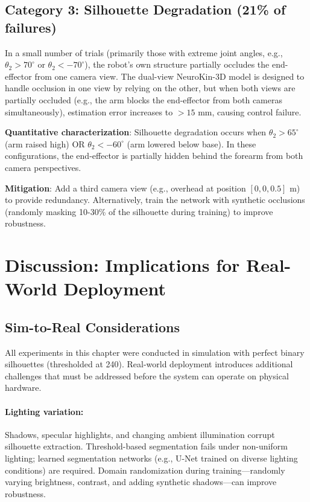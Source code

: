 ﻿\documentclass[12pt,a4paper,oneside]{report}
\begin{document}
\subsection{Category 3: Silhouette Degradation (21\% of failures)}

In a small number of trials (primarily those with extreme joint angles, e.g., $\theta_2 > 70^\circ$ or $\theta_2 < -70^\circ$), the robot's own structure partially occludes the end-effector from one camera view. The dual-view NeuroKin-3D model is designed to handle occlusion in one view by relying on the other, but when both views are partially occluded (e.g., the arm blocks the end-effector from both cameras simultaneously), estimation error increases to $>15$ mm, causing control failure.

\textbf{Quantitative characterization}: Silhouette degradation occurs when $\theta_2 > 65^\circ$ (arm raised high) OR $\theta_2 < -60^\circ$ (arm lowered below base). In these configurations, the end-effector is partially hidden behind the forearm from both camera perspectives.

\textbf{Mitigation}: Add a third camera view (e.g., overhead at position $[0, 0, 0.5]$ m) to provide redundancy. Alternatively, train the network with synthetic occlusions (randomly masking 10-30\% of the silhouette during training) to improve robustness.

\section{Discussion: Implications for Real-World Deployment}

\subsection{Sim-to-Real Considerations}

All experiments in this chapter were conducted in simulation with perfect binary silhouettes (thresholded at 240). Real-world deployment introduces additional challenges that must be addressed before the system can operate on physical hardware.

\paragraph{Lighting variation:} Shadows, specular highlights, and changing ambient illumination corrupt silhouette extraction. Threshold-based segmentation fails under non-uniform lighting; learned segmentation networks (e.g., U-Net trained on diverse lighting conditions) are required. Domain randomization during training---randomly varying brightness, contrast, and adding synthetic shadows---can improve robustness.
\end{document}
